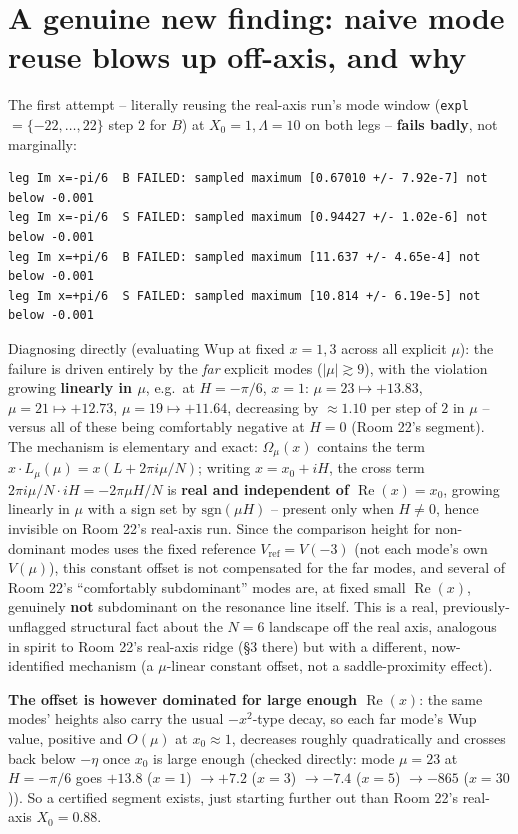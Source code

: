 \documentclass[11pt]{article}
\begin{document}
\section{A genuine new finding: naive mode reuse blows up off-axis, and why}
The first attempt -- literally reusing the real-axis run's mode window (\texttt{expl} $=\{-22,\ldots,22\}$
step 2 for $B$) at $X_0=1,\Lambda=10$ on both legs -- \textbf{fails badly}, not marginally:
\begin{verbatim}
leg Im x=-pi/6  B FAILED: sampled maximum [0.67010 +/- 7.92e-7] not below -0.001
leg Im x=-pi/6  S FAILED: sampled maximum [0.94427 +/- 1.02e-6] not below -0.001
leg Im x=+pi/6  B FAILED: sampled maximum [11.637 +/- 4.65e-4] not below -0.001
leg Im x=+pi/6  S FAILED: sampled maximum [10.814 +/- 6.19e-5] not below -0.001
\end{verbatim}
Diagnosing directly (evaluating $\mathrm{Wup}$ at fixed $x=1,3$ across all explicit $\mu$): the failure is
driven entirely by the \emph{far} explicit modes ($|\mu|\gtrsim9$), with the violation growing
\textbf{linearly in $\mu$}, e.g.\ at $H=-\pi/6$, $x=1$: $\mu=23\mapsto+13.83$, $\mu=21\mapsto+12.73$,
$\mu=19\mapsto+11.64$, decreasing by $\approx1.10$ per step of $2$ in $\mu$ -- versus all of these being
comfortably negative at $H=0$ (Room 22's segment). The mechanism is elementary and exact: $\Omega_\mu(x)$
contains the term $x\cdot L_\mu(\mu)=x(L+2\pi i\mu/N)$; writing $x=x_0+iH$, the cross term
$2\pi i\mu/N\cdot iH=-2\pi\mu H/N$ is \textbf{real and independent of $\operatorname{Re}(x)=x_0$}, growing
linearly in $\mu$ with a sign set by $\mathrm{sgn}(\mu H)$ -- present only when $H\ne0$, hence invisible on
Room 22's real-axis run. Since the comparison height for non-dominant modes uses the fixed reference
$V_{\mathrm{ref}}=V(-3)$ (not each mode's own $V(\mu)$), this constant offset is not compensated for the
far modes, and several of Room 22's ``comfortably subdominant'' modes are, at fixed small
$\operatorname{Re}(x)$, genuinely \textbf{not} subdominant on the resonance line itself. This is a real,
previously-unflagged structural fact about the $N=6$ landscape off the real axis, analogous in spirit to
Room 22's real-axis ridge (\S3 there) but with a different, now-identified mechanism (a $\mu$-linear
constant offset, not a saddle-proximity effect).

\textbf{The offset is however dominated for large enough $\operatorname{Re}(x)$}: the same modes' heights
also carry the usual $-x^2$-type decay, so each far mode's Wup value, positive and $O(\mu)$ at
$x_0\approx1$, decreases roughly quadratically and crosses back below $-\eta$ once $x_0$ is large enough
(checked directly: mode $\mu=23$ at $H=-\pi/6$ goes $+13.8$ ($x=1$) $\to+7.2$ ($x=3$) $\to-7.4$ ($x=5$)
$\to-865$ ($x=30$)). So a certified segment exists, just starting further out than Room 22's real-axis
$X_0=0.88$.
\end{document}
